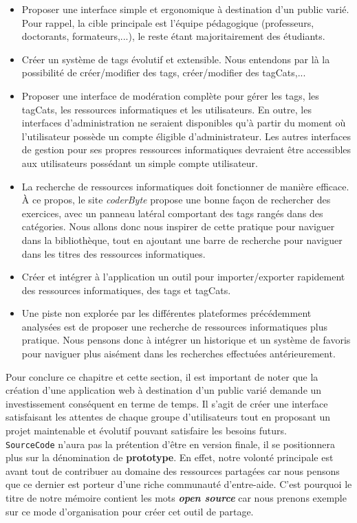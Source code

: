 \begin{itemize}
    \item Proposer une interface simple et ergonomique à destination d'un public varié. Pour rappel, la cible principale est l'équipe pédagogique (professeurs, doctorants, formateurs,...), le reste étant majoritairement des étudiants.
    \item Créer un système de \glspl{tag} évolutif et extensible. Nous entendons par là la possibilité de créer/modifier des \glspl{tag}, créer/modifier des \glspl{tagCat},...
    \item Proposer une interface de modération complète pour gérer les \glspl{tag}, les \glspl{tagCat}, les ressources informatiques et les utilisateurs. En outre, les interfaces d'administration ne seraient disponibles qu'à partir du moment où l'utilisateur possède un compte éligible d'administrateur. Les autres interfaces de gestion pour ses propres ressources informatiques devraient être accessibles aux utilisateurs possédant un simple compte utilisateur.
    \item La recherche de ressources informatiques doit fonctionner de manière efficace. À ce propos, le site \textit{coderByte} propose une bonne façon de rechercher des exercices, avec un panneau latéral comportant des \glspl{tag} rangés dans des catégories. Nous allons donc nous inspirer de cette pratique pour naviguer dans la bibliothèque, tout en ajoutant une barre de recherche pour naviguer dans les titres des ressources informatiques.
    \item Créer et intégrer à l'application un outil pour importer/exporter rapidement des ressources informatiques, des \glspl{tag} et \glspl{tagCat}. 
    \item Une piste non explorée par les différentes plateformes précédemment analysées est de proposer une recherche de ressources informatiques plus pratique. Nous pensons donc à intégrer un historique et un système de favoris pour naviguer plus aisément dans les recherches effectuées antérieurement.
\end{itemize}

Pour conclure ce chapitre et cette section, il est important de noter que la création d'une application web à destination d'un public varié demande un investissement conséquent en terme de temps. Il s'agit de créer une interface satisfaisant les attentes de chaque groupe d'utilisateurs tout en proposant un projet maintenable et évolutif pouvant satisfaire les besoins futurs.\\

\texttt{SourceCode} n'aura pas la prétention d'être en version finale, il se positionnera plus sur la dénomination de \textbf{prototype}. En effet, notre volonté principale est avant tout de contribuer au domaine des ressources partagées car nous pensons que ce dernier est porteur d'une riche communauté d'entre-aide. C'est pourquoi le titre de notre mémoire contient les mots \textbf{\textit{open source}} car nous prenons exemple sur ce mode d'organisation pour créer cet outil de partage.
